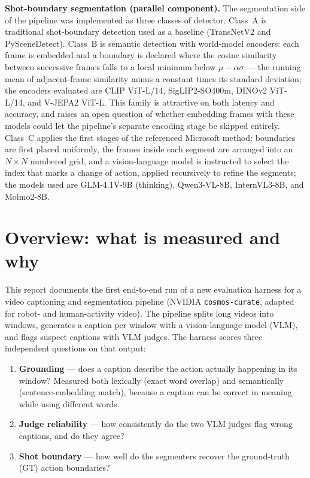 \documentclass[10pt,letterpaper]{article}
\begin{document}
\textbf{Shot-boundary segmentation (parallel component).} The segmentation side of the pipeline was
implemented as three classes of detector. Class~A is traditional shot-boundary detection used as a
baseline (TransNetV2 and PySceneDetect). Class~B is semantic detection with world-model encoders:
each frame is embedded and a boundary is declared where the cosine similarity between successive
frames falls to a local minimum below $\mu - \alpha\sigma$ --- the running mean of adjacent-frame
similarity minus a constant times its standard deviation; the encoders evaluated are CLIP ViT-L/14,
SigLIP2-SO400m, DINOv2 ViT-L/14, and V-JEPA2 ViT-L. This family is attractive on both latency and
accuracy, and raises an open question of whether embedding frames with these models could let the
pipeline's separate encoding stage be skipped entirely. Class~C applies the first stages of the
referenced Microsoft method: boundaries are first placed uniformly, the frames inside each segment
are arranged into an $N\times N$ numbered grid, and a vision-language model is instructed to select
the index that marks a change of action, applied recursively to refine the segments; the models
used are GLM-4.1V-9B (thinking), Qwen3-VL-8B, InternVL3-8B, and Molmo2-8B.

\section{Overview: what is measured and why}

This report documents the first end-to-end run of a new evaluation harness for a video
captioning and segmentation pipeline (NVIDIA \texttt{cosmos-curate}, adapted for robot- and
human-activity video). The pipeline splits long videos into windows, generates a caption per
window with a vision-language model (VLM), and flags suspect captions with VLM judges. The
harness scores three independent questions on that output:

\begin{enumerate}
  \item \textbf{Grounding} --- does a caption describe the action actually happening in its
        window? Measured both lexically (exact word overlap) and semantically (sentence-embedding
        match), because a caption can be correct in meaning while using different words.
  \item \textbf{Judge reliability} --- how consistently do the two VLM judges flag wrong
        captions, and do they agree?
  \item \textbf{Shot boundary} --- how well do the segmenters recover the ground-truth (GT)
        action boundaries?
\end{enumerate}
\end{document}
